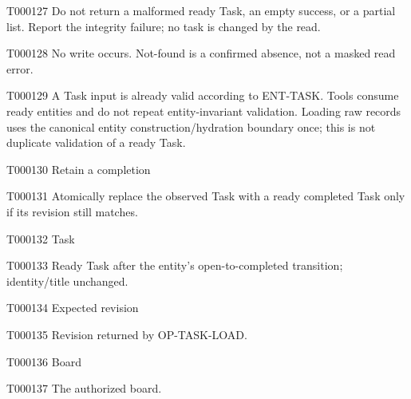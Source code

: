 \documentclass[11pt,a4paper]{article}
\begin{document}
\begin{atlasparagraph}{T000127}
Do not return a malformed ready Task, an empty success, or a partial list. Report the integrity failure; no task is changed by the read.
\end{atlasparagraph}
\begin{atlasparagraph}{T000128}
No write occurs. Not-found is a confirmed absence, not a masked read error.
\end{atlasparagraph}
\begin{atlasparagraph}{T000129}
A Task input is already valid according to ENT-TASK. Tools consume ready entities and do not repeat entity-invariant validation. Loading raw records uses the canonical entity construction/hydration boundary once; this is not duplicate validation of a ready Task.
\end{atlasparagraph}
\begin{atlastext}{T000130}
Retain a completion
\end{atlastext}
\begin{atlasparagraph}{T000131}
Atomically replace the observed Task with a ready completed Task only if its revision still matches.
\end{atlasparagraph}
\begin{atlastext}{T000132}
Task
\end{atlastext}
\begin{atlasparagraph}{T000133}
Ready Task after the entity's open-to-completed transition; identity/title unchanged.
\end{atlasparagraph}
\begin{atlastext}{T000134}
Expected revision
\end{atlastext}
\begin{atlasparagraph}{T000135}
Revision returned by OP-TASK-LOAD.
\end{atlasparagraph}
\begin{atlastext}{T000136}
Board
\end{atlastext}
\begin{atlasparagraph}{T000137}
The authorized board.
\end{atlasparagraph}
\end{document}
